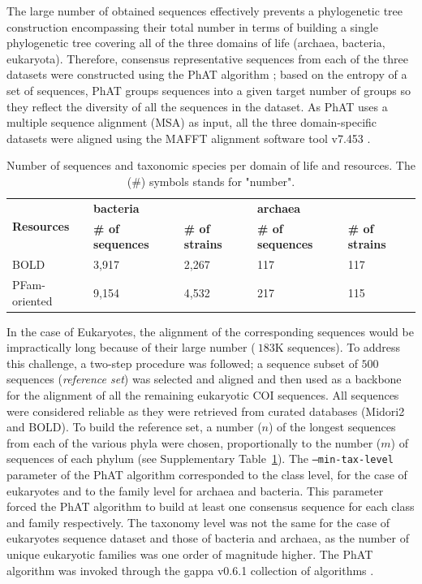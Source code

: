    The large number of obtained sequences effectively prevents a phylogenetic tree construction encompassing their total number in terms of building a single phylogenetic tree covering all of the three domains of life (archaea, bacteria, eukaryota). 
   Therefore, consensus representative sequences from each of the three datasets were constructed using 
   the PhAT algorithm \citep{czech2019methods}; 
   based on the entropy of a set of sequences, PhAT groups sequences into a given target number of groups so they reflect the diversity of all the sequences in the dataset. 
   As PhAT uses a multiple sequence alignment (MSA) as input, all the three domain-specific datasets were aligned using the MAFFT alignment software tool v7.453 \citep{katoh2002mafft, nakamura2018parallelization}.
   
   \begin{table}[h]
      \begin{tabular}{@{}lllll@{}}
      \toprule
      \multirow{2}{*}{\textbf{Resources}} & \multicolumn{2}{l}{\textbf{bacteria}} & \multicolumn{2}{l}{\textbf{archaea}} \\ \cmidrule(l){2-5} 
      & \textbf{\# of sequences} & \textbf{\# of strains} & \textbf{\# of sequences} & \textbf{\# of strains} \\ \cmidrule(r){1-1}
      BOLD & 3,917 & 2,267 & 117 & 117 \\
      PFam-oriented & 9,154 & 4,532 & 217 & 115 \\ \bottomrule
      \end{tabular}
      \caption[Number of sequences and taxonomic species per domain of life and resources]{Number of sequences and taxonomic species per domain of life and resources. The (\#) symbols stands for "number".}
      \label{table:darn-seq-per-domain}
   \end{table}


   In the case of Eukaryotes, the alignment of the corresponding sequences would be impractically long because of their large number ($~183$K sequences). 
   To address this challenge, a two-step procedure was followed; 
   a sequence subset of $500$ sequences (\textit{reference set}) was selected and aligned and then used as a backbone for the alignment of all the remaining eukaryotic COI sequences. 
   All sequences were considered reliable as they were retrieved from curated databases (Midori2 and BOLD). 
   To build the reference set, a number ($n$) of the longest sequences from each of the various phyla were chosen, proportionally to the number ($m$) of sequences of each phylum (see Supplementary Table~\ref{table:darn-seq-per-domain}). 
   The \texttt{--min-tax-level} parameter of the PhAT algorithm corresponded to the class level, for the case of eukaryotes and to the family level for archaea and bacteria. 
   This parameter forced the PhAT algorithm to build at least one consensus sequence for each class and family respectively. 
   The taxonomy level was not the same for the case of eukaryotes sequence dataset and those of bacteria and archaea, as the number of unique eukaryotic families was one order of magnitude higher. 
   The PhAT algorithm was invoked through the gappa v0.6.1 collection of algorithms \citep{czech2020genesis}.


